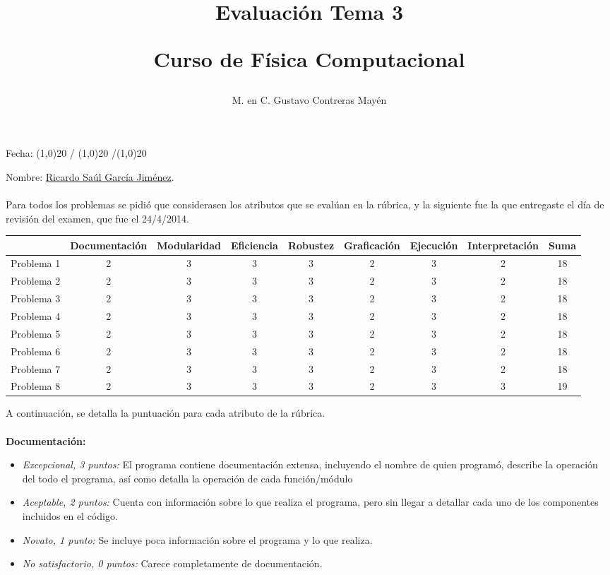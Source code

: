 \documentclass[letterpaper]{article}
\title{Evaluación Tema 3 \\ \begin{large}Curso de Física Computacional\end{large}}
\author{M. en C. Gustavo Contreras Mayén}
\date{ }
\begin{document}
\maketitle
\fontsize{10}{10}\selectfont
{}
\begin{flushright}
Fecha: \line(1,0){20} / \line(1,0){20} /\line(1,0){20}
\end{flushright}
Nombre: \underline{Ricardo Saúl García Jiménez}.
\\
\\
\fontsize{14}{14}\selectfont
Para todos los problemas se pidió que considerasen los atributos que se evalúan en la rúbrica, y la siguiente fue la que entregaste el día de revisión del examen, que fue el 24/4/2014.
\fontsize{10}{10}\selectfont
\begin{center}
\renewcommand{\arraystretch}{2.5}
\begin{tabular}{| l | c | c | c | c | c | c | c | c |}
\hline
 & Documentación & Modularidad & Eficiencia & Robustez & Graficación & Ejecución & Interpretación & Suma \\ \hline
Problema 1 & 2 & 3 & 3 & 3 & 2 & 3 & 2 & 18 \\ \hline
Problema 2 & 2 & 3 & 3 & 3 & 2 & 3 & 2 & 18 \\ \hline
Problema 3 & 2 & 3 & 3 & 3 & 2 & 3 & 2 & 18 \\ \hline
Problema 4 & 2 & 3 & 3 & 3 & 2 & 3 & 2 & 18 \\ \hline
Problema 5 & 2 & 3 & 3 & 3 & 2 & 3 & 2 & 18 \\ \hline
Problema 6 & 2 & 3 & 3 & 3 & 2 & 3 & 2 & 18 \\ \hline
Problema 7 & 2 & 3 & 3 & 3 & 2 & 3 & 2 & 18 \\ \hline
Problema 8 & 2 & 3 & 3 & 3 & 2 & 3 & 3 & 19 \\ \hline
\end{tabular}
\end{center}
\fontsize{14}{14}\selectfont
A continuación, se detalla la puntuación para cada atributo de la rúbrica.
\\
\\
\textbf{Documentación:}
\begin{itemize}
\item \emph{Excepcional, 3 puntos:} El programa contiene documentación extensa, incluyendo el nombre de quien programó, describe la operación del todo el programa, así como detalla la operación de cada función/módulo
\item \emph{Aceptable, 2 puntos:} Cuenta con información sobre lo que realiza el programa, pero sin llegar a detallar cada uno de los componentes incluidos en el código.
\item \emph{Novato, 1 punto:} Se incluye poca información sobre el programa y lo que realiza.
\item \emph{No satisfactorio, 0 puntos:} Carece completamente de documentación.
\end{itemize}
\end{document}
